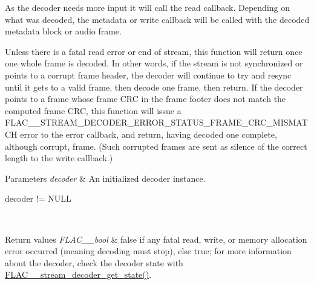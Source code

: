 As the decoder needs more input it will call the read callback. Depending on what was decoded, the metadata or write callback will be called with the decoded metadata block or audio frame.

Unless there is a fatal read error or end of stream, this function will return once one whole frame is decoded. In other words, if the stream is not synchronized or points to a corrupt frame header, the decoder will continue to try and resync until it gets to a valid frame, then decode one frame, then return. If the decoder points to a frame whose frame C\+RC in the frame footer does not match the computed frame C\+RC, this function will issue a F\+L\+A\+C\+\_\+\+\_\+\+S\+T\+R\+E\+A\+M\+\_\+\+D\+E\+C\+O\+D\+E\+R\+\_\+\+E\+R\+R\+O\+R\+\_\+\+S\+T\+A\+T\+U\+S\+\_\+\+F\+R\+A\+M\+E\+\_\+\+C\+R\+C\+\_\+\+M\+I\+S\+M\+A\+T\+CH error to the error callback, and return, having decoded one complete, although corrupt, frame. (Such corrupted frames are sent as silence of the correct length to the write callback.)


\begin{DoxyParams}{Parameters}
{\em decoder} & An initialized decoder instance.  
\begin{DoxyCode}
decoder != NULL 
\end{DoxyCode}
 \\
\hline
\end{DoxyParams}

\begin{DoxyRetVals}{Return values}
{\em F\+L\+A\+C\+\_\+\+\_\+bool} & {\ttfamily false} if any fatal read, write, or memory allocation error occurred (meaning decoding must stop), else {\ttfamily true}; for more information about the decoder, check the decoder state with \hyperlink{group__flac__stream__decoder_ga5899c204ad7183ec04e41855090c0635}{F\+L\+A\+C\+\_\+\+\_\+stream\+\_\+decoder\+\_\+get\+\_\+state()}. \\
\hline
\end{DoxyRetVals}
\mbox{\label{group__flac__stream__decoder_ga5e07ca9bf67dabf2521737f63b2156e2}} 
